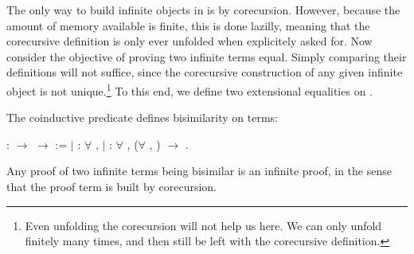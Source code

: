 The only way to build infinite objects in \Coq is by corecursion. However,
because the amount of memory available is finite, this is done lazilly,
meaning that the corecursive definition is only ever unfolded when explicitely
asked for. Now consider the objective of proving two infinite terms
equal. Simply comparing their definitions will not suffice, since the
corecursive construction of any given infinite object is not
unique.\footnote{Even unfolding the corecursion will not help us here. We can
  only unfold finitely many times, and then still be left with the corecursive
  definition.} To this end, we define two extensional equalities on
.

The coinductive predicate
 defines bisimilarity
on terms:
\begin{singlespace}
\begin{coqdoccode}
\coqdocnoindent
{}
 :
 \ensuremath{\rightarrow}
 \ensuremath{\rightarrow}
 :=\coqdoceol
\coqdocindent{1.00em}
\ensuremath{|}
 :
\ensuremath{\forall} ,
 
 \coqdoceol
\coqdocindent{1.00em}
\ensuremath{|}
 :
\ensuremath{\forall}   ,
(\ensuremath{\forall} ,
 
 )
\ensuremath{\rightarrow}
 
 
.\coqdoceol
\end{coqdoccode}
\end{singlespace}
Any proof of two infinite terms being bisimilar is an infinite proof, in the
sense that the proof term is built by corecursion.


